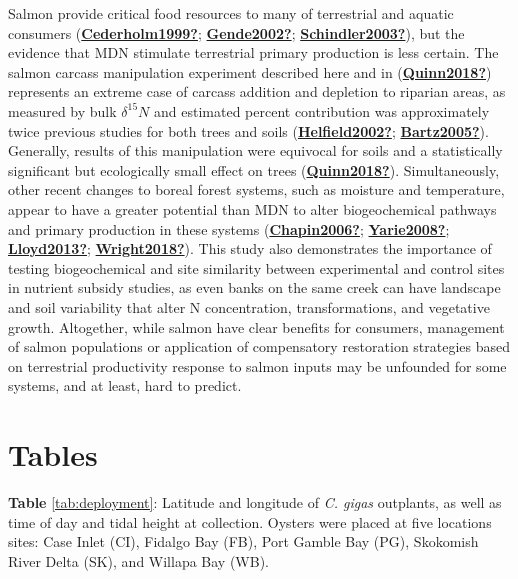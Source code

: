 \documentclass [11pt, proquest] {uwthesis}[2015/03/03]
\begin{document}
Salmon provide critical food resources to many of terrestrial and aquatic consumers (\protect\hyperlink{ref-Cederholm1999}{\textbf{Cederholm1999?}}; \protect\hyperlink{ref-Gende2002}{\textbf{Gende2002?}}; \protect\hyperlink{ref-Schindler2003}{\textbf{Schindler2003?}}), but the evidence that MDN stimulate terrestrial primary production is less certain. The salmon carcass manipulation experiment described here and in (\protect\hyperlink{ref-Quinn2018}{\textbf{Quinn2018?}}) represents an extreme case of carcass addition and depletion to riparian areas, as measured by bulk \(\delta^{15}N\) and estimated percent contribution was approximately twice previous studies for both trees and soils (\protect\hyperlink{ref-Helfield2002}{\textbf{Helfield2002?}}; \protect\hyperlink{ref-Bartz2005}{\textbf{Bartz2005?}}). Generally, results of this manipulation were equivocal for soils and a statistically significant but ecologically small effect on trees (\protect\hyperlink{ref-Quinn2018}{\textbf{Quinn2018?}}). Simultaneously, other recent changes to boreal forest systems, such as moisture and temperature, appear to have a greater potential than MDN to alter biogeochemical pathways and primary production in these systems (\protect\hyperlink{ref-Chapin2006}{\textbf{Chapin2006?}}; \protect\hyperlink{ref-Yarie2008}{\textbf{Yarie2008?}}; \protect\hyperlink{ref-Lloyd2013}{\textbf{Lloyd2013?}}; \protect\hyperlink{ref-Wright2018}{\textbf{Wright2018?}}). This study also demonstrates the importance of testing biogeochemical and site similarity between experimental and control sites in nutrient subsidy studies, as even banks on the same creek can have landscape and soil variability that alter N concentration, transformations, and vegetative growth. Altogether, while salmon have clear benefits for consumers, management of salmon populations or application of compensatory restoration strategies based on terrestrial productivity response to salmon inputs may be unfounded for some systems, and at least, hard to predict.

\hypertarget{tables}{%
\section{Tables}\label{tables}}

\textbf{Table} \ref{tab:deployment}: Latitude and longitude of \emph{C. gigas} outplants, as well as time of day and tidal height at collection. Oysters were placed at five locations sites: Case Inlet (CI), Fidalgo Bay (FB), Port Gamble Bay (PG), Skokomish River Delta (SK), and Willapa Bay (WB).
\end{document}
